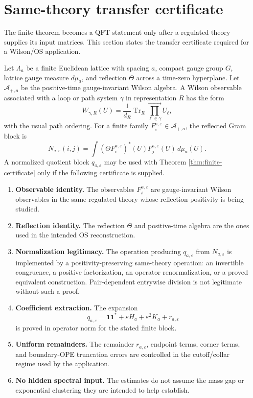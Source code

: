 \documentclass[11pt]{article}
\newcommand{\one}{\mathbf 1}
\newcommand{\eps}{\varepsilon}
\newcommand{\Tr}{\operatorname{Tr}}
\begin{document}
\section{Same-theory transfer certificate}
\label{sec:same-theory}

The finite theorem becomes a QFT statement only after a regulated theory supplies its input matrices.  This section states the transfer certificate required for a Wilson/OS application.

Let \(\Lambda_a\) be a finite Euclidean lattice with spacing \(a\), compact gauge group \(G\), lattice gauge measure \(d\mu_{a}\), and reflection \(\Theta\) across a time-zero hyperplane.  Let \(\mathcal A_{+,a}\) be the positive-time gauge-invariant Wilson algebra.  A Wilson observable associated with a loop or path system \(\gamma\) in representation \(R\) has the form
\begin{equation}
  W_{\gamma,R}(U)=\frac{1}{d_R}\Tr_R\prod_{\ell\in\gamma}^{\rightarrow} U_\ell,
  \label{eq:wilson-observable}
\end{equation}
with the usual path ordering.  For a finite family \(F_i^{a,\eps}\in\mathcal A_{+,a}\), the reflected Gram block is
\begin{equation}
  N_{a,\eps}(i,j)
  =\int (\Theta F_i^{a,\eps})^*(U)F_j^{a,\eps}(U)\,d\mu_a(U).
  \label{eq:regulated-gram}
\end{equation}
A normalized quotient block \(q_{a,\eps}\) may be used with Theorem \ref{thm:finite-certificate} only if the following certificate is supplied.

\begin{enumerate}[label=(C\arabic*)]
  \item \textbf{Observable identity.}  The observables \(F_i^{a,\eps}\) are gauge-invariant Wilson observables in the same regulated theory whose reflection positivity is being studied.
  \item \textbf{Reflection identity.}  The reflection \(\Theta\) and positive-time algebra are the ones used in the intended OS reconstruction.
  \item \textbf{Normalization legitimacy.}  The operation producing \(q_{a,\eps}\) from \(N_{a,\eps}\) is implemented by a positivity-preserving same-theory operation: an invertible congruence, a positive factorization, an operator renormalization, or a proved equivalent construction.  Pair-dependent entrywise division is not legitimate without such a proof.
  \item \textbf{Coefficient extraction.}  The expansion
  \begin{equation}
    q_{a,\eps}=\one\one^*+\eps H_a+\eps^2K_a+r_{a,\eps}
    \label{eq:a-eps-expansion}
  \end{equation}
  is proved in operator norm for the stated finite block.
  \item \textbf{Uniform remainders.}  The remainder \(r_{a,\eps}\), endpoint terms, corner terms, and boundary-OPE truncation errors are controlled in the cutoff/collar regime used by the application.
  \item \textbf{No hidden spectral input.}  The estimates do not assume the mass gap or exponential clustering they are intended to help establish.
\end{enumerate}
\end{document}
